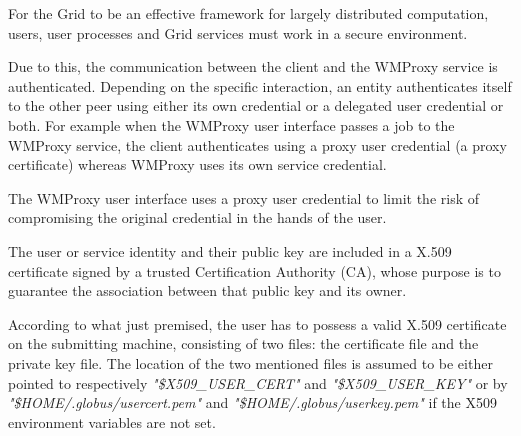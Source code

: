 
For the Grid to be an effective framework for largely distributed computation, users, user processes
and Grid services must work in a secure environment.
 
Due to this, the communication between the client and the WMProxy service is authenticated.
Depending on the specific interaction, an entity authenticates itself to the 
other peer using either its own credential or a delegated user credential or both. For example when the 
WMProxy user interface passes a job to the WMProxy service, the client authenticates using a 
proxy user credential 
(a proxy certificate) whereas WMProxy uses its own service credential. 

The WMProxy user interface uses a proxy user credential to limit the risk 
of compromising the original credential in the hands of the user. 
 
The user or service identity and their public key are included in a X.509 certificate signed by a trusted 
Certification Authority (CA), whose purpose is to guarantee the association between that public key and its 
owner.

According to what just premised, the user has to possess a valid X.509 
certificate on the submitting machine, consisting of two files: the certificate file and the private 
key file. The location of the two mentioned files is assumed to be either pointed to respectively 
\textit{"\$X509\_USER\_CERT"} and \textit{"\$X509\_USER\_KEY"} or 
by \textit{"\$HOME\-/.globus\-/usercert.pem"} and \textit{"\$HOME\-/.globus/\-userkey.pem"} if the 
X509 environment variables are not set. 

\medskip


